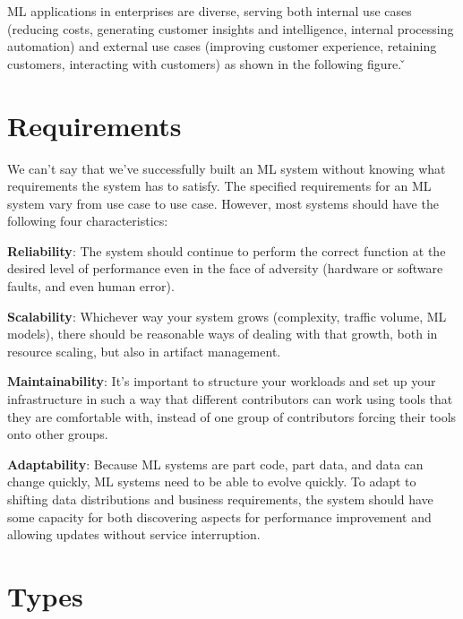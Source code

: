 ML applications in enterprises are diverse, serving both internal use cases (reducing costs, generating customer
insights and intelligence, internal processing automation) and external use cases (improving customer experience,
retaining customers, interacting with customers) as shown in the following figure. \v


\section{Requirements}

We can't say that we've successfully built an ML system without knowing what requirements the system has
to satisfy. The specified requirements for an ML system vary from use case to use case. However, most
systems should have the following four characteristics:
\bit
\item \textbf{Reliability}: The system should continue to perform the correct function at the desired level of
performance even in the face of adversity (hardware or software faults, and even human error).
\item \textbf{Scalability}: Whichever way your system grows (complexity, traffic volume, ML models),
there should be reasonable ways of dealing with that growth, both in resource scaling, but also in artifact management.
\item \textbf{Maintainability}: It's important to structure your workloads and set up your infrastructure in such a
way that different contributors can work using tools that they are comfortable with, instead of one group of
contributors forcing their tools onto other groups.
\item \textbf{Adaptability}: Because ML systems are part code, part data, and data can change quickly,
ML systems need to be able to evolve quickly. To adapt to shifting data distributions and business
requirements, the system should have some capacity for both discovering aspects for performance improvement and
allowing updates without service interruption.
\eit

\section{Types}

